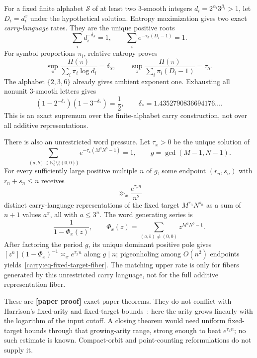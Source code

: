 \documentclass[11pt,oneside]{article}
\theoremstyle{definition}
\theoremstyle{remark}
\newcommand{\Nzero}{\mathbb N_0}
\newcommand{\statusnew}{\textcolor{newgreen}{\textbf{[paper proof]}}}
\begin{document}
For a fixed finite alphabet $\mathcal S$ of at least two $3$-smooth integers
$d_i=2^{\alpha_i}3^{\beta_i}>1$, let
$D_i=d_i^x$ under the hypothetical solution.  Entropy maximization gives two exact
\emph{carry-language} rates.  They are the unique positive roots
\begin{equation}
 \sum_i d_i^{-\delta_{\mathcal S}}=1,\qquad
 \sum_i e^{-\tau_{\mathcal S}(D_i-1)}=1.
 \label{carry:eq-finite-pressure}
\end{equation}
For symbol proportions $\pi_i$, relative entropy proves
\[
 \sup_\pi\frac{H(\pi)}{\sum_i\pi_i\log d_i}=\delta_{\mathcal S},\qquad
 \sup_\pi\frac{H(\pi)}{\sum_i\pi_i(D_i-1)}=\tau_{\mathcal S}.
\]
The alphabet $\{2,3,6\}$ already gives ambient exponent one.  Exhausting all nonunit
$3$-smooth letters gives
\begin{equation}
 (1-2^{-\delta_*})(1-3^{-\delta_*})=\frac12,\qquad
 \delta_*=1.4352790836694176\ldots .
 \label{carry:eq-delta-star}
\end{equation}
This is an exact supremum over the finite-alphabet carry construction, not over all additive
representations.

There is also an unrestricted word pressure.  Let $\tau_x>0$ be the unique solution of
\begin{equation}
 \sum_{(a,b)\in\Nzero^2\setminus\{(0,0)\}}
 e^{-\tau_x(M^aN^b-1)}=1,
 \qquad g=\gcd(M-1,N-1).
 \label{carry:eq-global-pressure}
\end{equation}
For every sufficiently large positive multiple $n$ of $g$, some endpoint $(r_n,s_n)$ with
$r_n+s_n\le n$ receives
\begin{equation}
 \gg_x\frac{e^{\tau_x n}}{n^2}
 \label{carry:eq-fixed-target-fiber}
\end{equation}
distinct carry-language representations of the fixed target $M^{r_n}N^{s_n}$ as a sum of
$n+1$ values $a^x$, all with $a\le3^n$.  The word generating series is
\[
 \frac1{1-\Phi_x(z)},\qquad
 \Phi_x(z)=\sum_{(a,b)\ne(0,0)}z^{M^aN^b-1}.
\]
After factoring the period $g$, its unique dominant positive pole gives
$[z^n](1-\Phi_x)^{-1}\asymp_x e^{\tau_xn}$ along $g\mid n$; pigeonholing among
$O(n^2)$ endpoints yields~\eqref{carry:eq-fixed-target-fiber}.  The matching upper rate is
only for fibers generated by this unrestricted carry language, not for the full additive
representation fiber.

These are \statusnew{} exact paper theorems.  They do not conflict with Harrison's
fixed-arity and fixed-target bounds~\cite{Harrison2026}: here the arity grows linearly with
the logarithm of the input cutoff.  A closing
theorem would need uniform fixed-target bounds through that growing-arity range, strong
enough to beat $e^{\tau_xn}$; no such estimate is known.  Compact-orbit and point-counting
reformulations do not supply it.
\end{document}
